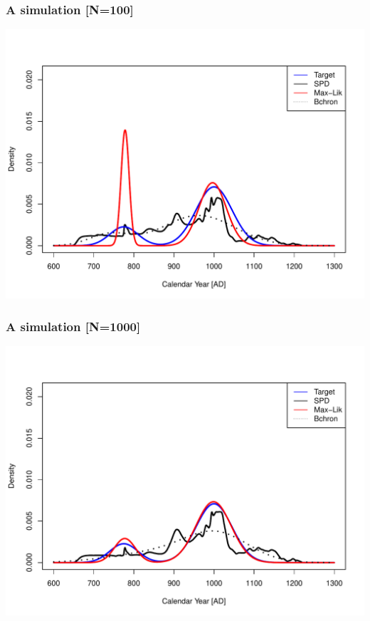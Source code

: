\documentclass{beamer}
\begin{document}
\begin{frame}[t]
  \frametitle{A simulation [N=100]}
    \includegraphics[height=.85\textheight]{sim_target_spd_max-lik_bchron_100.pdf}
\end{frame}

\begin{frame}[t]
  \frametitle{A simulation [N=1000]}
    \includegraphics[height=.85\textheight]{sim_target_spd_max-lik_bchron_1000.pdf}
\end{frame}
\end{document}
